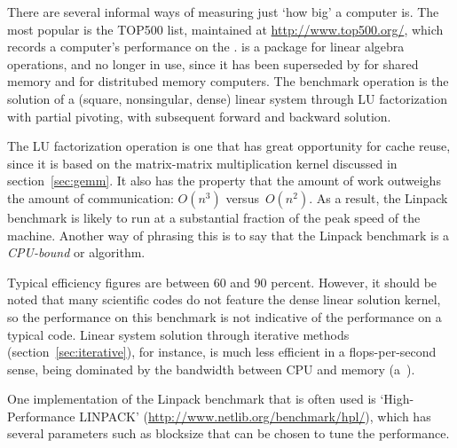 
There are several informal ways of measuring just `how big' a computer
is. The most popular is the TOP500 list, maintained at
\url{http://www.top500.org/}, which records a computer's performance
on the .  is a
package for linear algebra operations, and no longer in use, since it
has been superseded by  for shared memory and
 for distritubed memory computers. The benchmark
operation is the solution of a (square, nonsingular, dense) linear
system through LU factorization with partial pivoting, with subsequent
forward and backward solution.

The LU factorization operation is one that has great opportunity for
cache reuse, since it is based on the matrix-matrix multiplication
kernel discussed in section~\ref{sec:gemm}. It also has the property
that the amount of work outweighs the amount of communication:
$O(n^3)$ versus~$O(n^2)$.  As a result, the Linpack benchmark is
likely to run at a substantial fraction of the peak speed of the
machine. Another way of phrasing this is to say that the Linpack
benchmark is a \emph{CPU-bound} or 
algorithm.

Typical efficiency figures are between 60 and 90 percent. However, it
should be noted that many scientific codes do not feature the dense
linear solution kernel, so the performance on this benchmark is not
indicative of the performance on a typical code. Linear system
solution through iterative methods (section~\ref{sec:iterative}), for
instance, is much less efficient in a flops-per-second sense, being
dominated by the bandwidth between CPU and memory
(a~).

One implementation of the Linpack benchmark that is often used is
`High-Performance LINPACK'
(\url{http://www.netlib.org/benchmark/hpl/}), which has several
parameters such as blocksize that can be chosen to tune the performance.

